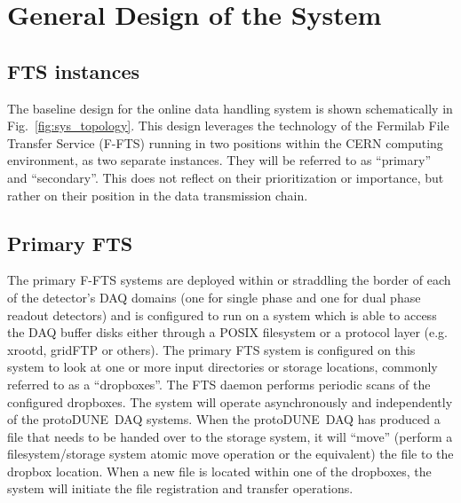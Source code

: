 \documentclass[pdftex,12pt,letter]{article}
\newcommand{\pd}{protoDUNE\ }
\begin{document}

\section{General Design of the System}
\subsection{FTS instances}
The baseline design for the online data handling system is shown schematically in Fig.~\ref{fig:sys_topology}.  This design leverages the technology of the Fermilab
File Transfer Service (F-FTS) running in two positions within the CERN computing environment, as two separate instances. They will be referred to as ``primary'' and
``secondary''. This does not reflect on their prioritization or importance, but rather on their position in the data transmission chain.

\subsection{Primary FTS}
The  primary F-FTS systems are deployed within or straddling the border
of each of the detector’s DAQ domains (one for single phase and one for dual phase readout detectors) and is
configured to run on a system which is able to access the DAQ buffer disks either through a POSIX filesystem or
a protocol layer (e.g. xrootd, gridFTP or others).  The primary FTS system is configured on this system
to look at one or more input directories or storage locations, commonly referred to as a ``dropboxes''.
The FTS daemon performs periodic scans of the configured dropboxes. The system will operate asynchronously
and independently of the \pd DAQ systems.  When the \pd DAQ has produced a file that needs to be handed over
to the storage system, it will ``move'' (perform a filesystem/storage system atomic move operation or the equivalent)
the file to the dropbox location. When a new file is located within one of the dropboxes,
the system will initiate the file registration and transfer operations.
\end{document}
